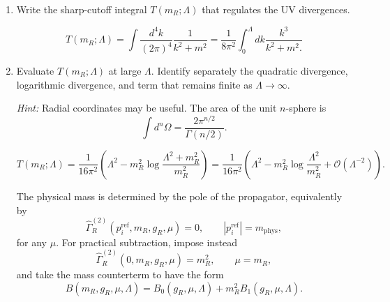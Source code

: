 \begin{enumerate}[label=\alph*), resume]
    \item Write the sharp-cutoff integral $T(m_R;\Lambda)$ that regulates the UV
    divergences.
    \begin{solution}
        \begin{equation}
            T(m_R;\Lambda) = \int \frac{d^4k}{(2\pi)^4}\frac{1}{k^2 +m^2} = \frac{1}{8\pi^2}\int^\Lambda_0dk \frac{k^3}{k^2+m^2.}
        \end{equation}
    \end{solution}

    \item Evaluate $T(m_R;\Lambda)$ at large $\Lambda$. Identify separately the
    quadratic divergence, logarithmic divergence, and term that remains finite as
    $\Lambda\to\infty$.

    \textit{Hint:} Radial coordinates may be useful. The area of the unit
    $n$-sphere is
    \begin{equation}
        \int d^n\Omega
        =\frac{2\pi^{n/2}}{\Gamma(n/2)}.
    \end{equation}
    \begin{solution}
        \begin{equation}
            T(m_R;\Lambda) = \frac{1}{16\pi^2}\left(\Lambda^2 - m_R^2\log \frac{\Lambda^2 +m_R^2}{m_R^2}\right) =  \frac{1}{16\pi^2}\left(\Lambda^2 - m_R^2\log \frac{\Lambda^2 }{m_R^2} + \mathcal{O}(\Lambda^{-2})\right).
        \end{equation}
    \end{solution}

    The physical mass is determined by the pole of the propagator, equivalently
    by
    \begin{equation}
        \widehat\Gamma_R^{(2)}
        (p_i^{\mathrm{ref}},m_R,g_R,\mu)=0,
        \qquad
        |p_i^{\mathrm{ref}}|=m_{\mathrm{phys}},
    \end{equation}
    for any $\mu$. For practical subtraction, impose instead
    \begin{equation}
        \widehat\Gamma_R^{(2)}(0,m_R,g_R,\mu)=m_R^2,
        \qquad
        \mu=m_R,
    \end{equation}
    and take the mass counterterm to have the form
    \begin{equation}
        B(m_R,g_R,\mu,\Lambda)
        =B_0(g_R,\mu,\Lambda)
        +m_R^2B_1(g_R,\mu,\Lambda).
    \end{equation}


\end{enumerate}

